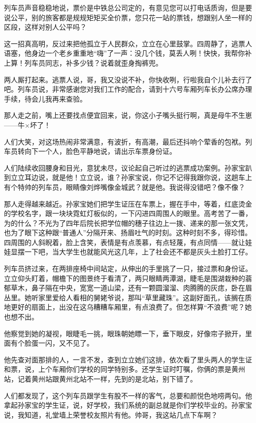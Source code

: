 \documentclass[lang=cn,newtx,12pt,scheme=chinese]{elegantbook}
\begin{document}
列车员声音稳稳地说，票价是中铁总公司定的，有意见您可以打电话质询，但是要说公平，别的旅客都是规规矩矩买全价票，您只花一站的票钱，想跟别人坐一样的区段，这样对别人公平吗？

这一招真高明，反过来把他孤立于人民群众，立立在心里鼓掌。四周静了，逃票人语塞，他身边一个老乡重重地“嗨”了一声：没几个钱，莫丢人咧！快快，我帮你补上算！列车员同志，补多少钱？说着就歪身掏裤兜。

两人厮打起来。逃票人说，哥，我又没说不补，你快收咧，行啦我自个儿补去行了吧。列车员说，非常感谢您对我们工作的配合，请到十六号车厢列车长办公席办理手续，待会儿我再来查验。

那人走之前，嘴上还要找点便宜回来，说，你这小子嘴头挺行啊，真是母牛不生崽——牛×坏了！

人们大笑，对这场热闹非常满意，有波折，有高潮，最后还抖响个荤香的包袱。列车员转向下一个人，脸色平静地说，请出示车票身份证。

人们陆续收回腰身和目光，意犹未尽，议论起自己听过的逃票成功案例。孙家宝趴到立立耳边说，就是他！立立说，谁？孙家宝说，你记不记得我跟你说，这趟车上有个特帅的列车员，眼睛像刘烨嘴像金城武？就是他。我说得没错吧？像不像？

那人走得越来越近。孙家宝她们把学生证压在车票上，握在手中，等着，红底烫金的学校名字，跟一块块霓虹灯板似的，一下闪进四周围人的眼里。高考苦了一番，为的什么？不光为了四年后院长把学位帽的穗子往边上一拨、递来的那一张文凭，也为了眼下这种跟“普通人”分隔开来、扬眉吐气的时刻。这种时刻不多，得珍惜。四周围的人斜睨着，脸上含笑，表情是有点羡慕，有点轻蔑，有点同情——就让娃娃显摆一下吧，当大学生也就能风光这几年，上了社会还不都是灰头土脸打工仔。

列车员挤过来，在两排座椅中间站定，从伸出的手里挑了一只，接过票和身份证。立立仰头盯着，帽檐下的图景终于看清了，两只眼睛两潭湖，睫毛是围湖栽种的蓊郁草木，鼻子隔在中央，宽宽一道山梁，还有一颗圆溜溜、肉腾腾的灰痣，卧在眉丛里。她听家里爱给人看相的舅姥爷说，那叫“草里藏珠”。这副好面孔，该搁在质地更好的扇面上，出没在这乌糟糟车厢里，有点浪费了。但怎样算“不浪费”呢？她也想不出。

他察觉到她的凝视，眼睫毛一挑，眼珠朝她瞟一下，垂下眼皮，好像帘子掀开，里面有个脸蛋一闪，又不见了。

他先查对面那排的人，一言不发，查到立立她们这排，依次看了里头两人的学生证和票，说，上个车厢你们学校的同学特别多。还学生证时叮嘱，你俩的票是黄州站，记着黄州站跟黄州北站不一样，先到的是北站，别下错了。

人们都发现了，这个列车员跟学生有股不一样的客气，总要和颜悦色地唠两句。他拿起孙家宝的学生证，说，好学校，我们系统的副总就是你们学校毕业的。孙家宝说，我知道，礼堂墙上荣誉校友照片有他。帅哥，我这站几点下车啊？
\end{document}
